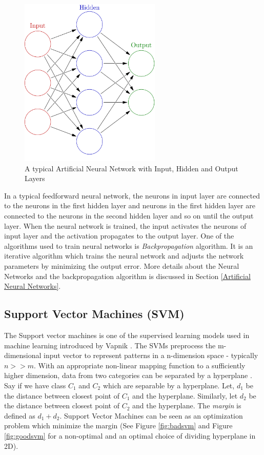         \begin{figure}[hbtp]
          \centering
          \includegraphics[width=0.6\textwidth]{Chapter-2/nn}
          \caption{A typical Artificial Neural Network with Input, Hidden and Output Layers\cite{nnimage}}
          \label{fig:nn}
  		\end{figure}
    
        In a typical feedforward neural network, the neurons in input layer are connected to the neurons in the first hidden layer and neurons in the first hidden layer are connected to the neurons in the second hidden layer and so on until the output layer. When the neural network is trained, the input activates the neurons of input layer and the activation propagates to the output layer. One of the algorithms used to train neural networks is \textit{Backpropagation} algorithm. It is an iterative algorithm which trains the neural network and adjusts the network parameters by minimizing the output error. More details about the Neural Networks and the backpropagation algorithm is discussed in Section \ref{Artificial Neural Networks}.

	\subsection{Support Vector Machines (SVM)}
    \label{chap2:SVM}
		The Support vector machines is one of the supervised learning models used in machine learning introduced by Vapnik \cite{Boser:1992:TAO:130385.130401}. The SVMs preprocess the m-dimensional input vector to represent patterns in a n-dimension space - typically $n>>m$. With an appropriate non-linear mapping function to a sufficiently higher dimension, data from two categories can be separated by a hyperplane \cite{duda2001pattern}. Say if we have class $C_1$ and $C_2$ which are separable by a hyperplane. Let, $d_1$ be the distance between closest point of $C_1$ and the hyperplane. Similarly, let $d_2$ be the distance between closest point of $C_2$ and the hyperplane. The \textit{margin} is defined as $d_1 + d_2$. Support Vector Machines can be seen as an optimization problem which minimize the margin \cite{snyder2010machine} (See Figure \ref{fig:badsvm} and Figure \ref{fig:goodsvm} for a non-optimal and an optimal choice of dividing hyperplane in 2D).
        

